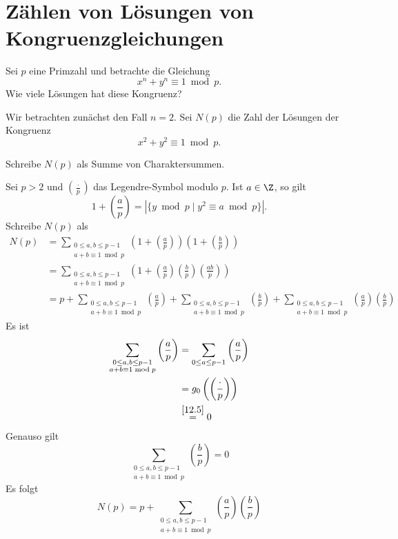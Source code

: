 \section{Zählen von Lösungen von Kongruenzgleichungen}

\begin{frage*}
	Sei $p$ eine Primzahl und betrachte die Gleichung
	\[ x^n + y^n \equiv 1 \bmod p. \]
	Wie viele Lösungen hat diese Kongruenz?
\end{frage*}

Wir betrachten zunächst den Fall $n = 2$. Sei $N(p)$ die Zahl der Lösungen der Kongruenz 
\[ x^2+y^2 \equiv 1 \bmod p. \]

\begin{idee*}
	Schreibe $N(p)$ als Summe von Charaktersummen.
\end{idee*}

Sei $p>2$ und $\left(\frac{\cdot}{p}\right)$ das Legendre-Symbol modulo $p$. Ist $a \in \Z$, so gilt
\[ 1 + \left(\frac{a}{p}\right) = \left| \{ y \bmod p \mid y^2 \equiv a \bmod p\} \right|. \]
Schreibe $N(p)$ als
\begin{align*}
	N(p) &= \sum_{\substack{0 \leq a, b \leq p-1\\a + b \equiv 1 \bmod p}} \left( 1 + \left(\frac{a}{p}\right) \right) \left( 1 + \left(\frac{b}{p}\right) \right)\\
	&= \sum_{\substack{0 \leq a, b \leq p-1\\a + b \equiv 1 \bmod p}} \left( 1 + \left(\frac{a}{p}\right) \left(\frac{b}{p}\right) \left(\frac{ab}{p}\right) \right)\\
	&= p + \sum_{\substack{0 \leq a, b \leq p-1\\a + b \equiv 1 \bmod p}} \left(\frac{a}{p}\right) + \sum_{\substack{0 \leq a, b \leq p-1\\a + b \equiv 1 \bmod p}} \left(\frac{b}{p}\right) + \sum_{\substack{0 \leq a, b \leq p-1\\a + b \equiv 1 \bmod p}} \left(\frac{a}{p}\right)\left(\frac{b}{p}\right)
\end{align*}
Es ist
\begin{align*}
	\sum_{\substack{0 \leq a, b \leq p-1\\a + b \equiv 1 \bmod p}} \left(\frac{a}{p}\right) &= \sum_{0 \leq a \leq p-1} \left(\frac{a}{p}\right)\\
	&= g_0 \left( \left(\frac{\cdot}{p}\right) \right)\\
	&\overset{\ref{12.5}}{=} 0 
\end{align*}
Genauso gilt
\[ \sum_{\substack{0 \leq a, b \leq p-1\\a + b \equiv 1 \bmod p}} \left(\frac{b}{p}\right) = 0 \]
Es folgt
\[ N(p) = p + \sum_{\substack{0 \leq a, b \leq p-1\\a + b \equiv 1 \bmod p}} \left(\frac{a}{p}\right)\left(\frac{b}{p}\right) \]

